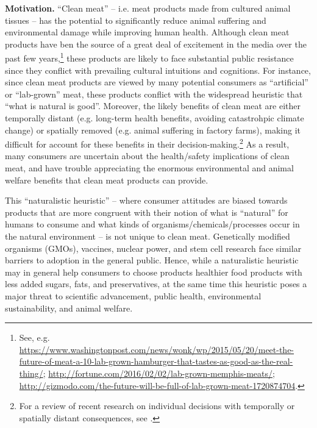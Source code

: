 \documentclass[12pt]{article}
\begin{document}
\textbf{Motivation.} ``Clean meat'' -- i.e. meat products made from cultured animal tissues -- has the potential to significantly reduce animal suffering and environmental damage while improving human health. Although clean meat products have ben the source of a great deal of excitement in the media over the past few years,\footnote{See, e.g. \href{https://www.washingtonpost.com/news/wonk/wp/2015/05/20/meet-the-future-of-meat-a-10-lab-grown-hamburger-that-tastes-as-good-as-the-real-thing/}{https://www.washingtonpost.com/news/wonk/wp/2015/05/20/meet-the-future-of-meat-a-10-lab-grown-hamburger-that-tastes-as-good-as-the-real-thing/}; \href{http://fortune.com/2016/02/02/lab-grown-memphis-meats/}{http://fortune.com/2016/02/02/lab-grown-memphis-meats/}; \href{http://gizmodo.com/the-future-will-be-full-of-lab-grown-meat-1720874704}{http://gizmodo.com/the-future-will-be-full-of-lab-grown-meat-1720874704}.} these products are likely to face substantial public resistance since they conflict with prevailing cultural intuitions and cognitions. For instance, since clean meat products are viewed by many potential consumers as ``artificial'' or ``lab-grown'' meat, these products conflict with the widespread heuristic that ``what is natural is good''. Moreover, the likely benefits of clean meat are either temporally distant (e.g. long-term health benefits, avoiding catastrohpic climate change) or spatially removed (e.g. animal suffering in factory farms), making it difficult for account for these benefits in their decision-making.\footnote{For a review of recent research on individual decisions with temporally or spatially distant consequences, see \citet{Wade-Benzoni2009,Markowitz2012}.} As a result, many consumers are uncertain about the health/safety implications of clean meat, and have trouble appreciating the enormous environmental and animal welfare benefits that clean meat products can provide.

This ``naturalistic heuristic'' -- where consumer attitudes are biased towards products that are more congruent with their notion of what is ``natural'' for humans to consume and what kinds of organisms/chemicals/processes occur in the natural environment -- is not unique to clean meat. Genetically modified organisms (GMOs), vaccines, nuclear power, and stem cell research face similar barriers to adoption in the general public. Hence, while a naturalistic heuristic may in general help consumers to choose products healthier food products with less added sugars, fats, and preservatives, at the same time this heuristic poses a major threat to scientific advancement, public health, environmental sustainability, and animal welfare.
\end{document}
